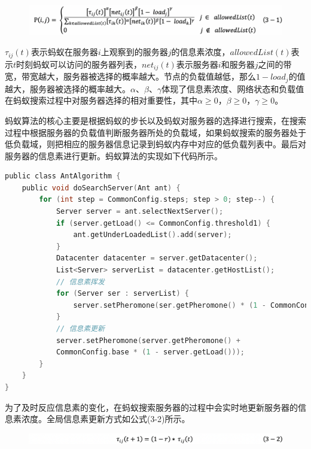 \begin{figure}[htb]
  \centering
  \includegraphics[width=0.95\linewidth]{./Figure/IMG_Chap3_5.png}
\end{figure}

$ \tau_{ij} (t) $表示蚂蚁在服务器$ i $上观察到的服务器$ j $的信息素浓度，$ allowedList(t) $表示$ t $时刻蚂蚁可以访问的服务器列表，$ net_{ij} (t) $表示服务器$ i $和服务器$ j $之间的带宽，带宽越大，服务器被选择的概率越大。节点的负载值越低，那么$ 1 - load_j $的值越大，服务器被选择的概率越大。$ \alpha $、$ \beta $、$ \gamma $体现了信息素浓度、网络状态和负载值在蚂蚁搜索过程中对服务器选择的相对重要性，其中$ \alpha ≥ 0 $，$ \beta ≥ 0 $，$ \gamma ≥ 0 $。

蚂蚁算法的核心主要是根据蚂蚁的步长以及蚂蚁对服务器的选择进行搜索，在搜索过程中根据服务器的负载值判断服务器所处的负载域，如果蚂蚁搜索的服务器处于低负载域，则把相应的服务器信息记录到蚂蚁内存中对应的低负载列表中。最后对服务器的信息素进行更新。蚂蚁算法的实现如下代码所示。

\begin{lstlisting}[language=C,caption={蚂蚁算法},label=Code:java]
public class AntAlgorithm {
    public void doSearchServer(Ant ant) {
        for (int step = CommonConfig.steps; step > 0; step--) {
            Server server = ant.selectNextServer();
            if (server.getLoad() <= CommonConfig.threshold1) {
                ant.getUnderLoadedList().add(server);
            }
            Datacenter datacenter = server.getDatacenter();
            List<Server> serverList = datacenter.getHostList();
            // 信息素挥发
            for (Server ser : serverList) {
                server.setPheromone(ser.getPheromone() * (1 - CommonConfig.rate));
            }
            // 信息素更新
            server.setPheromone(server.getPheromone() + 
            CommonConfig.base * (1 - server.getLoad()));
        }
    }
}
\end{lstlisting}

为了及时反应信息素的变化，在蚂蚁搜索服务器的过程中会实时地更新服务器的信息素浓度。全局信息素更新方式如公式(3-2)所示。

\begin{figure}[htb]
  \centering
  \includegraphics[width=0.95\linewidth]{./Figure/IMG_Chap3_6.png}
\end{figure}

